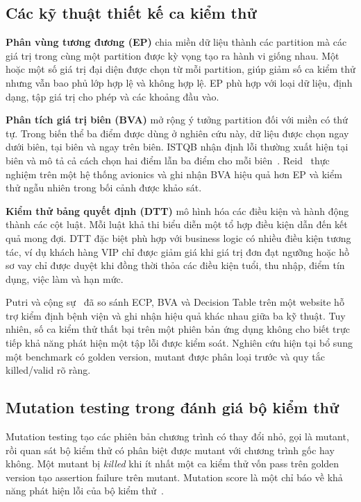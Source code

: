 \documentclass[runningheads]{llncs}
\begin{document}
\subsection{Các kỹ thuật thiết kế ca kiểm thử}

\textbf{Phân vùng tương đương (EP)} chia miền dữ liệu thành các partition mà các giá trị trong cùng một partition được kỳ vọng tạo ra hành vi giống nhau. Một hoặc một số giá trị đại diện được chọn từ mỗi partition, giúp giảm số ca kiểm thử nhưng vẫn bao phủ lớp hợp lệ và không hợp lệ. EP phù hợp với loại dữ liệu, định dạng, tập giá trị cho phép và các khoảng đầu vào.

\textbf{Phân tích giá trị biên (BVA)} mở rộng ý tưởng partition đối với miền có thứ tự. Trong biến thể ba điểm được dùng ở nghiên cứu này, dữ liệu được chọn ngay dưới biên, tại biên và ngay trên biên. ISTQB nhận định lỗi thường xuất hiện tại biên và mô tả cả cách chọn hai điểm lẫn ba điểm cho mỗi biên~\cite{istqb2021ctfl}. Reid~\cite{reid1997analysis} thực nghiệm trên một hệ thống avionics và ghi nhận BVA hiệu quả hơn EP và kiểm thử ngẫu nhiên trong bối cảnh được khảo sát.

\textbf{Kiểm thử bảng quyết định (DTT)} mô hình hóa các điều kiện và hành động thành các cột luật. Mỗi luật khả thi biểu diễn một tổ hợp điều kiện dẫn đến kết quả mong đợi. DTT đặc biệt phù hợp với business logic có nhiều điều kiện tương tác, ví dụ khách hàng VIP chỉ được giảm giá khi giá trị đơn đạt ngưỡng hoặc hồ sơ vay chỉ được duyệt khi đồng thời thỏa các điều kiện tuổi, thu nhập, điểm tín dụng, việc làm và hạn mức.

Putri và cộng sự~\cite{putri2024comparison} đã so sánh ECP, BVA và Decision Table trên một website hỗ trợ kiểm định bệnh viện và ghi nhận hiệu quả khác nhau giữa ba kỹ thuật. Tuy nhiên, số ca kiểm thử thất bại trên một phiên bản ứng dụng không cho biết trực tiếp khả năng phát hiện một tập lỗi được kiểm soát. Nghiên cứu hiện tại bổ sung một benchmark có golden version, mutant được phân loại trước và quy tắc killed/valid rõ ràng.

\subsection{Mutation testing trong đánh giá bộ kiểm thử}

Mutation testing tạo các phiên bản chương trình có thay đổi nhỏ, gọi là mutant, rồi quan sát bộ kiểm thử có phân biệt được mutant với chương trình gốc hay không. Một mutant bị \emph{killed} khi ít nhất một ca kiểm thử vốn pass trên golden version tạo assertion failure trên mutant. Mutation score là một chỉ báo về khả năng phát hiện lỗi của bộ kiểm thử~\cite{jia2011mutation}.
\end{document}
